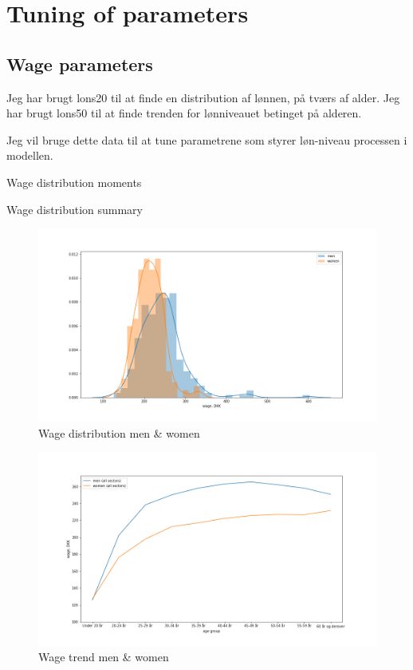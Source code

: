 \section{Tuning of parameters}

\subsection{Wage parameters}

Jeg har brugt lons20 til at finde en distribution af lønnen, på tværs af alder.
Jeg har brugt lons50 til at finde trenden for lønniveauet betinget på alderen.

Jeg vil bruge dette data til at tune parametrene som styrer løn-niveau processen i modellen.

\begin{table}[ht]
    \centering
    
    \caption{Wage distribution moments}
    \label{tab:my_label}
\end{table}


\begin{table}[ht]
    \centering
    
    \caption{Wage distribution summary}
    \label{tab:my_label}
\end{table}

\begin{figure}
    \centering
    \includegraphics[scale=0.4]{figures/wage_distribution_lons20.png}
    \caption{Wage distribution men \& women}
    \label{fig:my_label}
\end{figure}


\begin{figure}
    \centering
    \includegraphics[scale=0.4]{figures/wage_trend_lons50.png}
    \caption{Wage trend men \& women}
    \label{fig:my_label}
\end{figure}